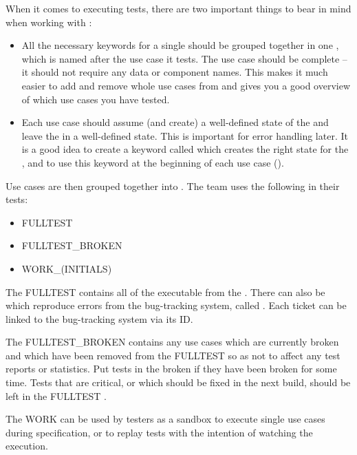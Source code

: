 When it comes to executing tests, there are two important things to bear in mind when working with \app{}:
\begin{itemize}
\item All the necessary keywords for a single  should be grouped together in one \gdcase{}, which is named after the use case it tests. The use case should be complete -- it should not require any data or component names. This makes it much easier to add and remove whole use cases from \gdsuites{} and gives you a good overview of which use cases you have tested.   
\item Each use case should assume (and create) a well-defined state of the \gdaut{} and leave the \gdaut{} in a well-defined state. This is important for error handling later. It is a good idea to create a keyword called  which creates the right state for the \gdaut{}, and to use this keyword at the beginning of each use case (). 
\end{itemize}


Use cases are then grouped together into \gdsuites{}. The \app{} team uses the following \gdsuites{} in their tests:
\begin{itemize}
\item FULLTEST
\item FULLTEST\_BROKEN
\item WORK\_(INITIALS)
\end{itemize}

The FULLTEST \gdsuite{} contains all of the executable  from the \gdproject{}. There can also be \gdcases{} which reproduce errors from the bug-tracking system, called . Each ticket \gdcase{} can be linked to the bug-tracking system via its ID. 


The FULLTEST\_BROKEN \gdsuite{} contains any use cases which are currently broken and which have been removed from the FULLTEST so as not to affect any test reports or statistics. Put tests in the broken \gdsuite{} if they have been broken for some time. Tests that are critical, or which should be fixed in the next build, should be left in the FULLTEST \gdsuite{}. 

The WORK \gdsuites{} can be used by testers as a sandbox to execute single use cases during specification, or to replay tests with the intention of watching the execution. 
